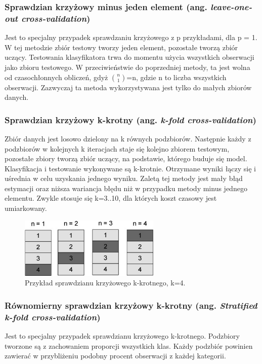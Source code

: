 \subsubsection{Sprawdzian krzyżowy minus jeden element (ang. \textit{leave-one-out cross-validation})}
Jest to specjalny przypadek sprawdzaniu krzyżowego z p przykładami, dla p = 1. W tej metodzie zbiór testowy tworzy jeden element, pozostałe tworzą zbiór uczący. Testowania klasyfikatora trwa do momentu użycia wszystkich obserwacji jako zbioru testowego. W przeciwieństwie do poprzedniej metody, ta jest wolna od czasochłonnych obliczeń, gdyż $\binom{n}{1}$=n, gdzie n to liczba wszystkich obserwacji. Zazwyczaj ta metoda wykorzystywana jest tylko do małych zbiorów danych.


\subsubsection{Sprawdzian krzyżowy k-krotny (ang. \textit{k-fold cross-validation})}
Zbiór danych jest losowo dzielony na k równych podzbiorów. Następnie każdy z podzbiorów w kolejnych k iteracjach staje się kolejno zbiorem testowym, pozostałe zbiory tworzą zbiór uczący, na podstawie, którego buduje się model. Klasyfikacja i testowanie wykonywane są k-krotnie. Otrzymane wyniki łączy się i uśrednia w celu uzyskania jednego wyniku. Zaletą tej metody jest mały błąd estymacji oraz niższa wariancja błędu niż w przypadku metody minus jednego elementu. Zwykle stosuje się k=3..10, dla których koszt czasowy jest umiarkowany.
\begin{figure}[h]
	\centering
	\includegraphics[width=0.6\textwidth]{./images/crossvalidation.jpg}
	\caption{Przykład sprawdzianu krzyżowego k-krotnego, k=4.}
	\label{fig:sprawdziankrzyzowy}
\end{figure}

\subsubsection{Równomierny sprawdzian krzyżowy k-krotny (ang. \textit{Stratified k-fold cross-validation})}
Jest to specjalny przypadek sprawdzianu krzyżowego k-krotnego. Podzbiory tworzone są z zachowaniem proporcji wszystkich klas. Każdy podzbiór powinien zawierać w przybliżeniu podobny procent obserwacji z każdej kategorii.

